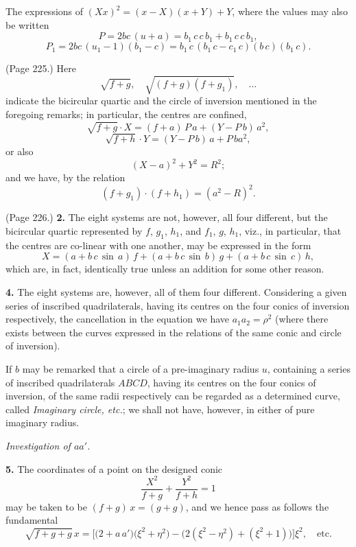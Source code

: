 \documentclass[11pt,a4paper]{article}
\theoremstyle{plain}
\theoremstyle{definition}
\begin{document}
The expressions of $(X x)^2 = (x - X)(x + Y) + Y$, where the values may also be written
\[
P = 2 b c\,(u + a) = b_1\,c\,c\,b_1 + b_1\,c\,c\,b_1,
\]
\[
P_1 = 2 b c\,(u_1 - 1)(b_1 - c) = b_1\,c\,(b_1\,c - c_1\,c)(b\,c)(b_1\,c).
\]

\medskip

\noindent (Page 225.) Here
\[
\sqrt{f + g}, \quad \sqrt{(f + g)(f + g_1)}, \quad \ldots
\]
indicate the bicircular quartic and the circle of inversion mentioned in the foregoing remarks; in particular, the centres are confined,
\[
\sqrt{f + g}\cdot X = (f + a)\,P\,a + (Y - P\,b)\,a^2,
\]
\[
\sqrt{f + h}\cdot Y = (Y - P\,b)\,a + P\,b a^2,
\]
or also
\[
(X - a)^2 + Y^2 = R^2;
\]
and we have, by the relation
\[
( f + g_1) \cdot (f + h_1) = (a^2 - R)^2.
\]

\medskip

\noindent (Page 226.) \textbf{2.} The eight systems are not, however, all four different, but the bicircular quartic represented by $f$, $g_1$, $h_1$, and $f_1$, $g$, $h_1$, viz., in particular, that the centres are co-linear with one another, may be expressed in the form
\[
X = (a + b\,c\,\sin\,a)\,f + (a + b\,c\,\sin\,b)\,g + (a + b\,c\,\sin\,c)\,h,
\]
which are, in fact, identically true unless an addition for some other reason.

\medskip

\noindent\textbf{4.} The eight systems are, however, all of them four different. Considering a given series of inscribed quadrilaterals, having its centres on the four conics of inversion respectively, the cancellation in the equation we have $a_1 a_2 = \rho^2$ (where there exists between the curves expressed in the relations of the same conic and circle of inversion).

If $b$ may be remarked that a circle of a pre-imaginary radius $u$, containing a series of inscribed quadrilaterals $A B C D$, having its centres on the four conics of inversion, of the same radii respectively can be regarded as a determined curve, called \textit{Imaginary circle, etc.}; we shall not have, however, in either of pure imaginary radius.

\medskip

\noindent\textit{Investigation of $a a'$.}

\medskip

\noindent\textbf{5.} The coordinates of a point on the designed conic
\[
\frac{X^2}{f + g} + \frac{Y^2}{f + h} = 1
\]
may be taken to be $(f + g)\,x = (g + g)$, and we hence pass as follows the fundamental
\[
\sqrt{f + g + g}\,x = \big[ \big(2 + a\,a'\big)\big(\xi^2 + \eta^2\big) - \big(2(\xi^2 - \eta^2) + (\xi^2 + 1)\big)\big] \xi^2, \quad \text{etc.}
\]
\end{document}
